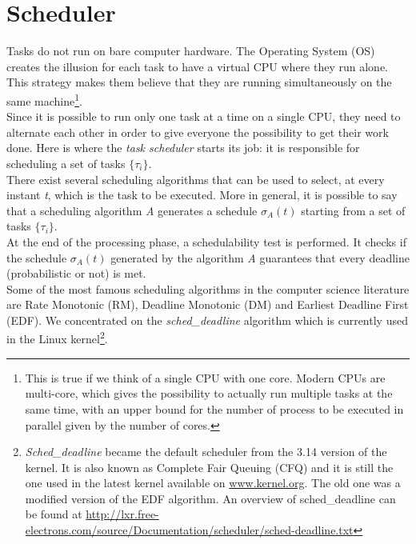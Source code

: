 \section{Scheduler}
Tasks do not run on bare computer hardware. The Operating System (OS) creates the illusion for each task to have a virtual CPU where they run alone. This strategy makes them believe that they are running simultaneously on the same machine\footnote{This is true if we think of a single CPU with one core. Modern CPUs are multi-core, which gives the possibility to actually run multiple tasks at the same time, with an upper bound for the number of process to be executed in parallel given by the number of cores.}.\\
Since it is possible to run only one task at a time on a single CPU, they need to alternate each other in order to give everyone the possibility to get their work done. Here is where the \emph{task scheduler} starts its job: it is responsible for scheduling a set of tasks \( \{\tau_{i}\} \).\\
There exist several scheduling algorithms that can be used to select, at every instant \emph{t}, which is the task to be executed. More in general, it is possible to say that a scheduling algorithm \emph{A} generates a schedule \( \sigma_{A}\left(t\right) \) starting from a set of tasks \( \{\tau_{i}\} \).\\
At the end of the processing phase, a schedulability test is performed. It checks if the schedule \( \sigma_{A}\left(t\right) \) generated by the algorithm \emph{A} guarantees that every deadline (probabilistic or not) is met.\\
Some of the most famous scheduling algorithms in the computer science literature are Rate Monotonic (RM), Deadline Monotonic (DM) and Earliest Deadline First (EDF). We concentrated on the \emph{sched\_deadline} algorithm which is currently used in the Linux kernel\footnote{\emph{Sched\_deadline} became the default scheduler from the 3.14 version of the kernel. It is also known as Complete Fair Queuing (CFQ) and it is still the one used in the latest kernel available on \url{www.kernel.org}. The old one was a modified version of the EDF algorithm. An overview of sched\_deadline can be found at \url{http://lxr.free-electrons.com/source/Documentation/scheduler/sched-deadline.txt}}.

